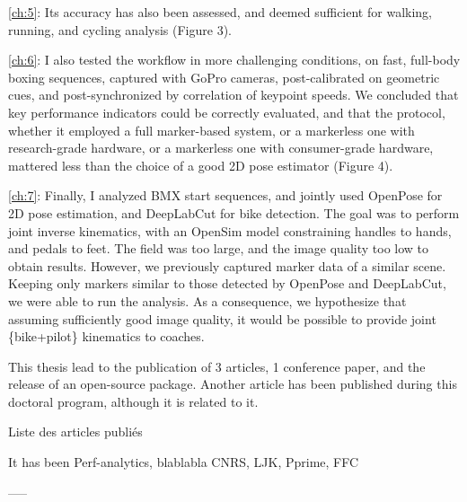 \autoref{ch:5}: Its accuracy has also been assessed, and deemed sufficient for walking, running, and cycling analysis \cite{Pagnon2022a} (Figure 3). 

\autoref{ch:6}: I also tested the workflow in more challenging conditions, on fast, full-body boxing sequences, captured with GoPro cameras, post-calibrated on geometric cues, and post-synchronized by correlation of keypoint speeds. We concluded that key performance indicators could be correctly evaluated, and that the protocol, whether it employed a full marker-based system, or a markerless one with research-grade hardware, or a markerless one with consumer-grade hardware, mattered less than the choice of a good 2D pose estimator \cite{Pagnon2022c} (Figure 4).  

\autoref{ch:7}: Finally, I analyzed BMX start sequences, and jointly used OpenPose for 2D pose estimation, and DeepLabCut for bike detection. The goal was to perform joint inverse kinematics, with an OpenSim model constraining handles to hands, and pedals to feet. The field was too large, and the image quality too low to obtain results. However, we previously captured marker data of a similar scene. Keeping only markers similar to those detected by OpenPose and DeepLabCut, we were able to run the analysis. As a consequence, we hypothesize that assuming sufficiently good image quality, it would be possible to provide joint \{bike+pilot\} kinematics to coaches. 





This thesis lead to the publication of 3 articles, 1 conference paper, and the release of an open-source package. Another article has been published during this doctoral program, although it is related to it.

Liste des articles publiés


It has been Perf-analytics, blablabla 
CNRS, LJK, Pprime, FFC


-----








